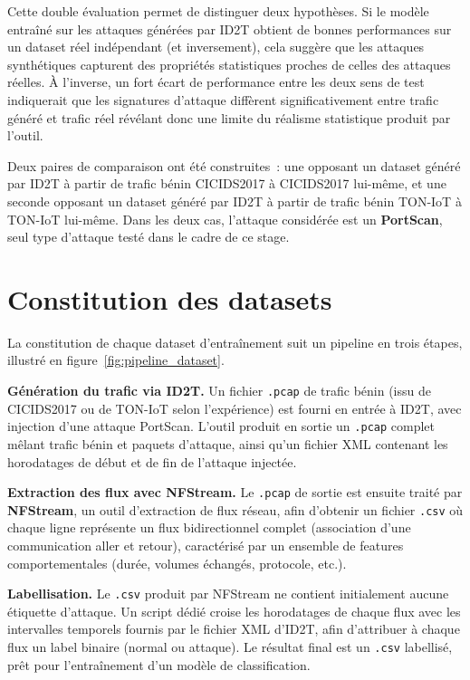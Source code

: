 \documentclass[12pt, a4paper]{report}
\begin{document}
Cette double évaluation permet de distinguer deux hypothèses. Si le modèle
entraîné sur les attaques générées par ID2T obtient de bonnes performances
sur un dataset réel indépendant (et inversement), cela suggère que les
attaques synthétiques capturent des propriétés statistiques proches de
celles des attaques réelles. À l'inverse, un fort écart de performance
entre les deux sens de test indiquerait que les signatures d'attaque
diffèrent significativement entre trafic généré et trafic réel révélant donc
une limite du réalisme statistique produit par l'outil.
 
Deux paires de comparaison ont été construites~: une opposant un dataset
généré par ID2T à partir de trafic bénin CICIDS2017 à CICIDS2017 lui-même,
et une seconde opposant un dataset généré par ID2T à partir de trafic
bénin TON-IoT à TON-IoT lui-même. Dans les deux cas, l'attaque considérée
est un \textbf{PortScan}, seul type d'attaque testé dans le cadre de ce
stage.
 
\section{Constitution des datasets}
 
La constitution de chaque dataset d'entraînement suit un pipeline en
trois étapes, illustré en figure~\ref{fig:pipeline_dataset}.
 
\textbf{Génération du trafic via ID2T.} Un fichier \texttt{.pcap} de
trafic bénin (issu de CICIDS2017 ou de TON-IoT selon l'expérience) est
fourni en entrée à ID2T, avec injection d'une attaque PortScan. L'outil
produit en sortie un \texttt{.pcap} complet mêlant trafic bénin et
paquets d'attaque, ainsi qu'un fichier XML contenant les horodatages
de début et de fin de l'attaque injectée.
 
\textbf{Extraction des flux avec NFStream.} Le \texttt{.pcap} de sortie
est ensuite traité par \textbf{NFStream}, un outil d'extraction de flux
réseau, afin d'obtenir un fichier \texttt{.csv} où chaque ligne représente
un flux bidirectionnel complet (association d'une communication aller et
retour), caractérisé par un ensemble de features comportementales
(durée, volumes échangés, protocole, etc.).
 
\textbf{Labellisation.} Le \texttt{.csv} produit par NFStream ne contient
initialement aucune étiquette d'attaque. Un script dédié croise les
horodatages de chaque flux avec les intervalles temporels fournis par
le fichier XML d'ID2T, afin d'attribuer à chaque flux un label binaire
(normal ou attaque). Le résultat final est un \texttt{.csv} labellisé,
prêt pour l'entraînement d'un modèle de classification.
 
\end{document}
